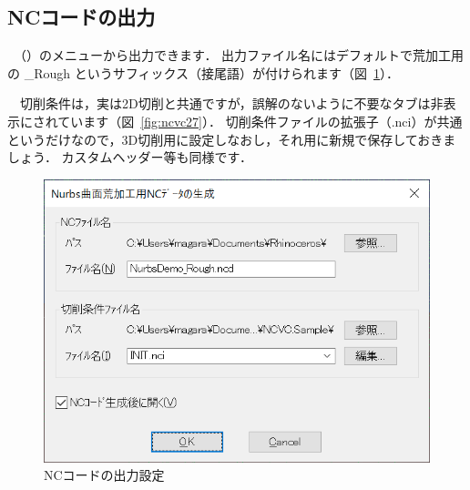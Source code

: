 \subsection{NCコードの出力}
　（）のメニューから出力できます．
出力ファイル名にはデフォルトで荒加工用の \_Rough というサフィックス（接尾語）が付けられます（図~\ref{fig:ncvc26}）．

　切削条件は，実は2D切削と共通ですが，誤解のないように不要なタブは非表示にされています（図~\ref{fig:ncvc27}）．
切削条件ファイルの拡張子（.nci）が共通というだけなので，3D切削用に設定しなおし，それ用に新規で保存しておきましょう．
カスタムヘッダー等も同様です．

\begin{minipage}{0.5\textwidth}
\begin{figure}[H]
\centering
\includegraphics[scale=0.7]{No2/fig/fig26.png}
\caption{NCコードの出力設定}
\label{fig:ncvc26}
\end{figure}
\end{minipage}
